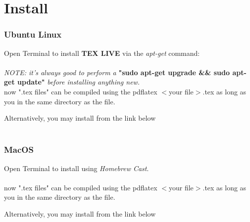 \section{Install}
\subsubsection{Ubuntu Linux}
Open Terminal to install \textbf{TEX LIVE} via the \textit{apt-get}
command: \\
\\

\textit{NOTE: it's always good to perform a} 
\textbf{"sudo apt-get upgrade \&\& sudo apt-get update"} 
\textit{before installing anything new.}\\

now ".tex files" can be compiled using the pdflatex $<$your file$>$.tex
as long as you in the same directory as the file. \\


\begin{center}
Alternatively, you may install from the link below \\
\\
\end{center}

\subsubsection{MacOS}
Open Terminal to install \MacTeX{} using \textit{Homebrew Cast}.\\

\\

now ".tex files" can be compiled using the pdflatex $<$your file$>$.tex
as long as you in the same directory as the file.\\

\begin{center}
Alternatively, you may install from the link below \\
\\
\end{center}


